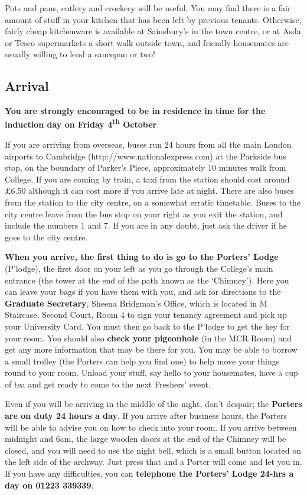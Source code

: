 \documentclass[11pt,fleqn, oneside]{book} %
\begin{document}
Pots and pans, cutlery and crockery will be useful. You may find there is a fair amount of stuff in your kitchen that has been left by previous tenants. Otherwise, fairly cheap kitchenware is available at Sainsbury’s in the town centre, or at Asda or Tesco supermarkets a short walk outside town, and friendly housemates are usually willing to lend a saucepan or two!


\subsection{Arrival}

\textbf{You are strongly encouraged to be in residence in time for the induction day on Friday 4\textsuperscript{th} October}. 

If you are arriving from overseas, buses run 24 hours from all the main London airports to Cambridge (http://www.nationalexpress.com) at the Parkside bus stop, on the boundary of Parker’s Piece, approximately 10 minutes walk from College. If you are coming by train, a taxi from the station should cost around £6.50 although it can cost more if you arrive late at night.  There are also buses from the station to the city centre, on a somewhat erratic timetable.  Buses to the city centre leave from the bus stop on your right as you exit the station, and include the numbers 1 and 7.  If you are in any doubt, just ask the driver if he goes to the city centre.

\textbf{When you arrive, the first thing to do is go to the Porters’ Lodge} (P’lodge), the first door on your left as you go through the College’s main entrance (the tower at the end of the path known as the ‘Chimney’). Here you can leave your bags if you have them with you, and ask for directions to the \textbf{Graduate Secretary}, Sheena Bridgman’s Office, which is located in M Staircase, Second Court, Room 4 to sign your tenancy agreement and pick up your University Card.  You must then go back to the P’lodge to get the key for your room. You should also \textbf{check your pigeonhole} (in the MCR Room) and get any more information that may be there for you. You may be able to borrow a small trolley (the Porters can help you find one) to help move your things round to your room. Unload your stuff, say hello to your housemates, have a cup of tea and get ready to come to the next Freshers’ event.

Even if you will be arriving in the middle of the night, don’t despair; the \textbf{Porters are on duty 24 hours a day}. If you arrive after business hours, the Porters will be able to advise you on how to check into your room. If you arrive between midnight and 6am, the large wooden doors at the end of the Chimney will be closed, and you will need to use the night bell, which is a small button located on the left side of the archway.  Just press that and a Porter will come and let you in. If you have any difficulties, you can \textbf{telephone the Porters’ Lodge 24-hrs a day on 01223 339339}.
\end{document}
